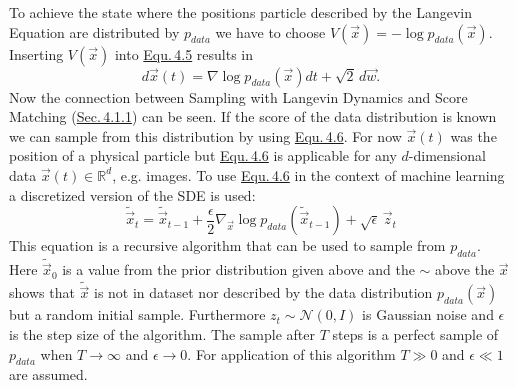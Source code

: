 To achieve the state where the positions particle described by the Langevin Equation are distributed by $p_{data}$ we have to choose $V(\vec{x})=-\log p_{data}({\vec{x}})$. Inserting $V(\vec{x})$ into \hyperref[equ:4.5]{Equ.\,4.5} results in
%
\begin{equation} \label{equ:4.6}
    d\vec{x}(t)=\nabla\log p_{data}(\vec{x})dt+\sqrt{2}\,d\vec{w}.
\end{equation}
%
Now the connection between Sampling with Langevin Dynamics and Score Matching (\hyperref[sec:4.1.1]{Sec.\,4.1.1}) can be seen. If the score of the data distribution is known we can sample from this distribution by using \hyperref[equ:4.6]{Equ.\,4.6}. For now $\vec{x}(t)$ was the position of a physical particle but \hyperref[equ:4.6]{Equ.\,4.6} is applicable for any $d$-dimensional data $\vec{x}(t)\in\mathbb{R}^d$, e.g. images. To use \hyperref[equ:4.6]{Equ.\,4.6} in the context of machine learning a discretized version of the SDE is used:
%
\begin{equation} \label{equ:4.7}
    \tilde{\vec{x}}_t=\tilde{\vec{x}}_{t-1}+\frac{\epsilon}{2}\nabla_{\vec{x}}\log p_{data}(\tilde{\vec{x}}_{t-1})+\sqrt{\epsilon}\,\vec{z}_t
\end{equation}
%
This equation is a recursive algorithm that can be used to sample from $p_{data}$. Here $\tilde{\vec{x}}_0$ is a value from the prior distribution given above and the $\sim$ above the $\vec{x}$ shows that $\tilde{\vec{x}}$ is not in dataset nor described by the data distribution $p_{data}(\vec{x})$ but a random initial sample. Furthermore $z_t\sim\mathcal{N}(0, I)$ is Gaussian noise and $\epsilon$ is the step size of the algorithm. The sample after $T$ steps is a perfect sample of $p_{data}$ when $T\rightarrow\infty$ and $\epsilon\rightarrow0$. For application of this algorithm $T\gg0$ and $\epsilon\ll1$ are assumed.

